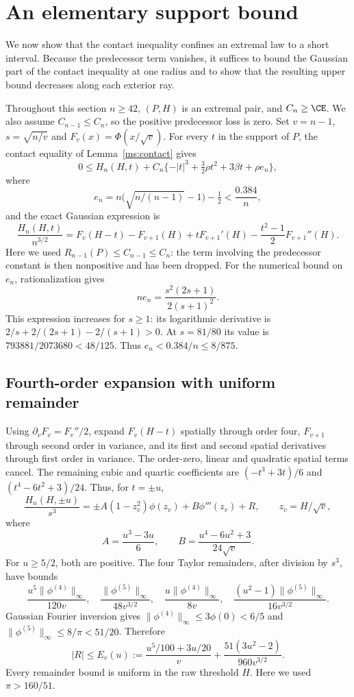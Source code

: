 \section{An elementary support bound}\label{ms:support}

We now show that the contact inequality confines an extremal law to a
short interval. Because the predecessor term vanishes, it suffices to bound
the Gaussian part of the contact inequality at one radius and to show that
the resulting upper bound decreases along each exterior ray.

Throughout this section $n\ge42$, $(P,H)$ is an
extremal pair, and $C_n\ge\CE$. We also assume
$C_{n-1}\le C_n$, so the positive predecessor loss is zero.
Set $v=n-1$, $s=\sqrt{n/v}$ and $F_v(x)=\Phi(x/\sqrt v)$. For every $t$ in
the support of $P$, the contact equality of Lemma~\ref{ms:contact} gives
\begin{equation}\label{ms:04:contact}
 0\le H_n(H,t)+C_n\{-|t|^3+\tfrac32\rho t^2+3\beta t+\rho e_n\},
\end{equation}
where
\[
 e_n=n\bigl(\sqrt{n/(n-1)}-1\bigr)-\tfrac12<\frac{0.384}{n},
\]
and the exact Gaussian expression is
\[
 \frac{H_n(H,t)}{n^{3/2}}
 =F_v(H-t)-F_{v+1}(H)+tF_{v+1}'(H)
       -\frac{t^2-1}{2}F_{v+1}''(H).
\]
Here we used $R_{n-1}(P)\le C_{n-1}\le C_n$: the term involving the
predecessor constant is then nonpositive and has been dropped.
For the numerical bound on $e_n$, rationalization gives
\[
 ne_n=\frac{s^2(2s+1)}{2(s+1)^2}.
\]
This expression increases for $s\ge1$: its logarithmic derivative is
$2/s+2/(2s+1)-2/(s+1)>0$. At $s=81/80$ its value is
$793881/2073680<48/125$. Thus $e_n<0.384/n\le8/875$.

\subsection{Fourth-order expansion with uniform remainder}
Using $\partial_vF_v=F_v''/2$, expand $F_v(H-t)$ spatially through order
four, $F_{v+1}$ through second order in variance, and its first and second
spatial derivatives through first order in variance. The order-zero, linear
and quadratic spatial terms cancel. The remaining cubic and quartic
coefficients are $(-t^3+3t)/6$ and $(t^4-6t^2+3)/24$. Thus, for $t=\pm u$,
\begin{equation}\label{ms:04:expansion}
 \frac{H_n(H,\pm u)}{s^3}
  =\pm A(1-z_v^2)\phi(z_v)+B\phi'''(z_v)+R,\qquad z_v=H/\sqrt v,
\end{equation}
where
\[
 A=\frac{u^3-3u}{6},\qquad B=\frac{u^4-6u^2+3}{24\sqrt v}.
\]
For $u\ge5/2$, both are positive. The four Taylor remainders, after division
by $s^3$, have bounds
\[
 \frac{u^5\|\phi^{(4)}\|_\infty}{120v},\quad
 \frac{\|\phi^{(5)}\|_\infty}{48v^{3/2}},\quad
 \frac{u\|\phi^{(4)}\|_\infty}{8v},\quad
 \frac{(u^2-1)\|\phi^{(5)}\|_\infty}{16v^{3/2}}.
\]
Gaussian Fourier inversion gives
$\|\phi^{(4)}\|_\infty\le3\phi(0)<6/5$ and
$\|\phi^{(5)}\|_\infty\le8/\pi<51/20$. Therefore
\begin{equation}\label{ms:04:error}
 |R|\le E_v(u):=\frac{u^5/100+3u/20}{v}
       +\frac{51(3u^2-2)}{960v^{3/2}}.
\end{equation}
Every remainder bound is uniform in the raw threshold $H$.
Here we used $\pi>160/51$.

